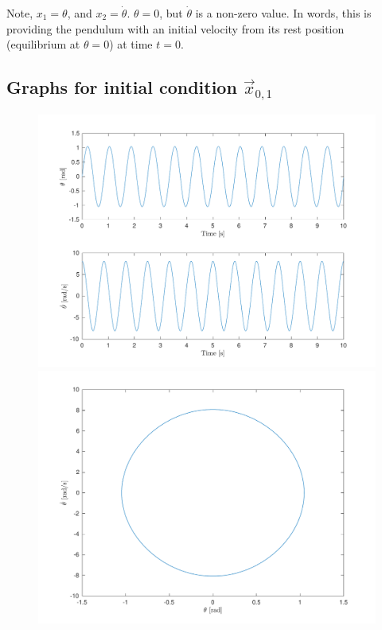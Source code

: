 \documentclass[10pt]{article}
\begin{document}
Note, $x_1 = \theta$, and $x_2 = \dot{\theta}$. 
$\theta = 0$, but $\dot{\theta}$ is a non-zero value. In words, this is providing the pendulum with an initial velocity from its rest position (equilibrium at $\theta = 0$) at time $t = 0$.

\subsection{Graphs for initial condition \texorpdfstring{$\vec{x}_{0,1}$}{x01}}
\begin{figure}[ht]
    \centering
    \begin{minipage}[b]{0.45\textwidth}
        \centering
        \includegraphics[width=1\linewidth]{lab1/figs/section3_x0_1_state_evolution.pdf}
    \end{minipage}
    \begin{minipage}[b]{0.45\textwidth}
        \centering
        \includegraphics[width=1\linewidth]{lab1/figs/section3_x0_1_state_orbit.pdf}
    \end{minipage}
    
    \label{figure:x_0_1_state_evolution}
\end{figure}
    
\end{document}
